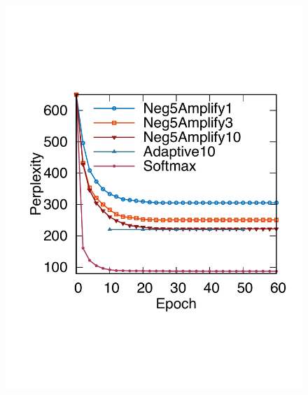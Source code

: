 \begin{figure}[ht]
	\centering
	\begin{minipage}{.31\textwidth}
		\centering
		\captionsetup{justification=centering,margin=0.1cm}
		\includegraphics[width=1\linewidth]{Graph/negSamp/L2Neg5_60_Nolog.pdf}


\end{minipage}
\end{figure}
